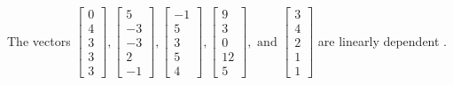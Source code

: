 \begin{exercise}
\begin{exerciseStatement}
  \end{exerciseStatement}
  \begin{exerciseAnswer}
   The vectors \(\left[\begin{array}{r}
0 \\
4 \\
3 \\
3 \\
3
\end{array}\right] , \left[\begin{array}{r}
5 \\
-3 \\
-3 \\
2 \\
-1
\end{array}\right] , \left[\begin{array}{r}
-1 \\
5 \\
3 \\
5 \\
4
\end{array}\right] , \left[\begin{array}{r}
9 \\
3 \\
0 \\
12 \\
5
\end{array}\right] , \text{ and } \left[\begin{array}{r}
3 \\
4 \\
2 \\
1 \\
1
\end{array}\right]\) are 
  	 linearly dependent  .
  


  \end{exerciseAnswer}
\end{exercise}